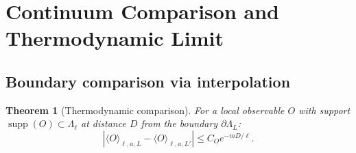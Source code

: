\documentclass[12pt]{article}
\theoremstyle{plain}
\newtheorem{theorem}{Theorem}[section]
\theoremstyle{definition}
\numberwithin{equation}{section}
\newcommand{\supp}{\operatorname{supp}}
\begin{document}
\section{Continuum Comparison and Thermodynamic Limit}\label{sec:continuum}

\subsection{Boundary comparison via interpolation}

\begin{theorem}[Thermodynamic comparison]\label{thm:thermocomp}
For a local observable $O$ with support $\supp(O)\subset\Lambda_\ell$ at distance $D$ from the boundary $\partial\Lambda_L$:
\begin{equation}
|\langle O\rangle_{\ell,a,L}-\langle O\rangle_{\ell,a,L'}| \leq C_O e^{-mD/\ell}.
\end{equation}
\end{theorem}
\end{document}

